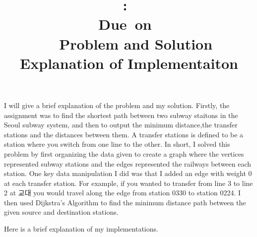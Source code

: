 \documentclass{article}
\title{
\vspace{2in}
\textmd{\textbf{\hmwkClass:\ \hmwkTitle}}\\
\normalsize\vspace{0.1in}\small{Due\ on\ \hmwkDueDate}\\
\vspace{0.1in}\large{\textit{\hmwkClassInstructor\ \hmwkClassTime}}
\vspace{3in}
}
\author{\textbf{\hmwkAuthorName}}
\date{} %
\begin{document}
\maketitle
\clearpage



\title{
\textmd{\textbf{Problem and Solution}}
}
\newline 
I will give a brief explanation of the problem and my solution.
\newline
Firstly, the assignment was to find the shortest path between two subway staitons in the Seoul subway system, and then to output the minimum distance,the transfer stations and the distances between them. A transfer stations is defined to be a station where you switch from one line to the other. 
\newline
In short, I solved this problem by first organizing the data given to create a graph where the vertices represented subway stations and the edges represented the railways between each station. One key data manipulation I did was that I added an edge with weight 0 at each transfer station. For example, if you wanted to transfer from line 3 to line 2 at 교대 you would travel along the edge from station 0330 to station 0224. I then used Dijkstra's Algorithm to find the minimum distance path between the given source and destination stations.

\clearpage
\title{
\textmd{\textbf{Explanation of Implementaiton}}
}
\newline

Here is a brief explanation of my implementations.
\end{document}
